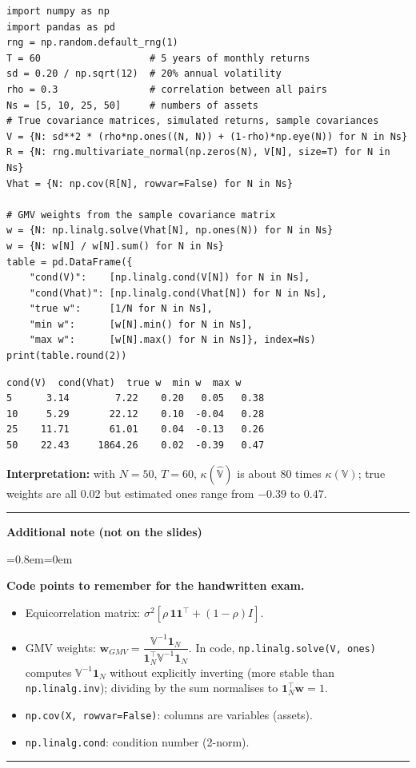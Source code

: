 \documentclass[11pt,a4paper]{report}
\newenvironment{notebox}[1]
  {\par\medskip\Needspace{6\baselineskip}\noindent\rule{\linewidth}{0.4pt}\par\nopagebreak
   \noindent\textbf{#1}\par\nopagebreak
   \begin{list}{}{\leftmargin=0.8em\rightmargin=0em\topsep=2pt}\item[]}
  {\end{list}\nopagebreak\noindent\rule{\linewidth}{0.4pt}\par\medskip}
\newenvironment{addnote}{\begin{notebox}{Additional note (not on the slides)}}{\end{notebox}}
\newcommand{\V}{\mathbb{V}}
\newcommand{\one}{\mathbf{1}_N}
\newcommand{\w}{\bm{w}}
\newcommand{\T}{^{\top}}
\begin{document}
\begin{lstlisting}
import numpy as np
import pandas as pd
rng = np.random.default_rng(1)
T = 60                   # 5 years of monthly returns
sd = 0.20 / np.sqrt(12)  # 20% annual volatility
rho = 0.3                # correlation between all pairs
Ns = [5, 10, 25, 50]     # numbers of assets
# True covariance matrices, simulated returns, sample covariances
V = {N: sd**2 * (rho*np.ones((N, N)) + (1-rho)*np.eye(N)) for N in Ns}
R = {N: rng.multivariate_normal(np.zeros(N), V[N], size=T) for N in Ns}
Vhat = {N: np.cov(R[N], rowvar=False) for N in Ns}

# GMV weights from the sample covariance matrix
w = {N: np.linalg.solve(Vhat[N], np.ones(N)) for N in Ns}
w = {N: w[N] / w[N].sum() for N in Ns}
table = pd.DataFrame({
    "cond(V)":    [np.linalg.cond(V[N]) for N in Ns],
    "cond(Vhat)": [np.linalg.cond(Vhat[N]) for N in Ns],
    "true w":     [1/N for N in Ns],
    "min w":      [w[N].min() for N in Ns],
    "max w":      [w[N].max() for N in Ns]}, index=Ns)
print(table.round(2))
\end{lstlisting}
\begin{lstlisting}[style=out]
    cond(V)  cond(Vhat)  true w  min w  max w
5      3.14        7.22    0.20   0.05   0.38
10     5.29       22.12    0.10  -0.04   0.28
25    11.71       61.01    0.04  -0.13   0.26
50    22.43     1864.26    0.02  -0.39   0.47
\end{lstlisting}
\textbf{Interpretation:} with $N=50$, $T=60$, $\kappa(\widehat{\V})$ is about
80 times $\kappa(\V)$; true weights are all 0.02 but estimated ones range from
$-0.39$ to $0.47$.

\begin{addnote}
\textbf{Code points to remember for the handwritten exam.}
\begin{itemize}
  \item Equicorrelation matrix: $\sigma^2[\rho\,\bm{1}\bm{1}\T+(1-\rho)I]$.
  \item GMV weights: $\w_{GMV}=\dfrac{\V^{-1}\one}{\one\T\V^{-1}\one}$. In code,
    \texttt{np.linalg.solve(V, ones)} computes $\V^{-1}\one$ without explicitly
    inverting (more stable than \texttt{np.linalg.inv}); dividing by the sum
    normalises to $\one\T\w=1$.
  \item \texttt{np.cov(X, rowvar=False)}: columns are variables (assets).
  \item \texttt{np.linalg.cond}: condition number (2-norm).
\end{itemize}
\end{addnote}
\end{document}

